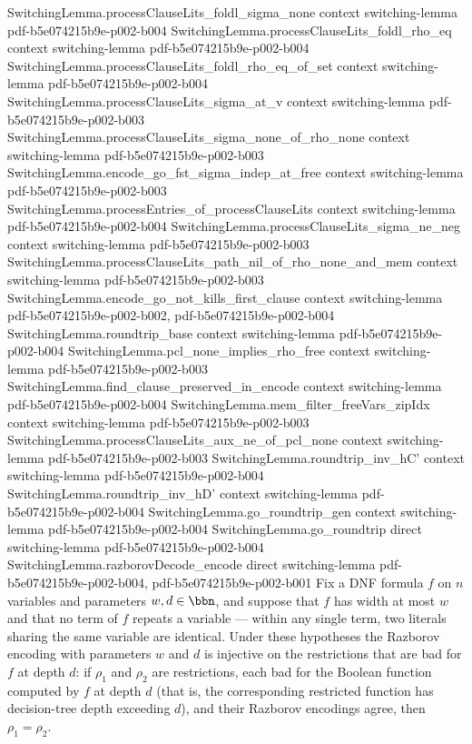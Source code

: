 \begin{theorem}
\proofstep
  {SwitchingLemma.processClauseLits_foldl_sigma_none}
  {context}
  {switching-lemma}
  {pdf-b5e074215b9e-p002-b004}
\proofstep
  {SwitchingLemma.processClauseLits_foldl_rho_eq}
  {context}
  {switching-lemma}
  {pdf-b5e074215b9e-p002-b004}
\proofstep
  {SwitchingLemma.processClauseLits_foldl_rho_eq_of_set}
  {context}
  {switching-lemma}
  {pdf-b5e074215b9e-p002-b004}
\proofstep
  {SwitchingLemma.processClauseLits_sigma_at_v}
  {context}
  {switching-lemma}
  {pdf-b5e074215b9e-p002-b003}
\proofstep
  {SwitchingLemma.processClauseLits_sigma_none_of_rho_none}
  {context}
  {switching-lemma}
  {pdf-b5e074215b9e-p002-b003}
\proofstep
  {SwitchingLemma.encode_go_fst_sigma_indep_at_free}
  {context}
  {switching-lemma}
  {pdf-b5e074215b9e-p002-b003}
\proofstep
  {SwitchingLemma.processEntries_of_processClauseLits}
  {context}
  {switching-lemma}
  {pdf-b5e074215b9e-p002-b004}
\proofstep
  {SwitchingLemma.processClauseLits_sigma_ne_neg}
  {context}
  {switching-lemma}
  {pdf-b5e074215b9e-p002-b003}
\proofstep
  {SwitchingLemma.processClauseLits_path_nil_of_rho_none_and_mem}
  {context}
  {switching-lemma}
  {pdf-b5e074215b9e-p002-b003}
\proofstep
  {SwitchingLemma.encode_go_not_kills_first_clause}
  {context}
  {switching-lemma}
  {pdf-b5e074215b9e-p002-b002,
    pdf-b5e074215b9e-p002-b004}
\proofstep
  {SwitchingLemma.roundtrip_base}
  {context}
  {switching-lemma}
  {pdf-b5e074215b9e-p002-b004}
\proofstep
  {SwitchingLemma.pcl_none_implies_rho_free}
  {context}
  {switching-lemma}
  {pdf-b5e074215b9e-p002-b003}
\proofstep
  {SwitchingLemma.find_clause_preserved_in_encode}
  {context}
  {switching-lemma}
  {pdf-b5e074215b9e-p002-b004}
\proofstep
  {SwitchingLemma.mem_filter_freeVars_zipIdx}
  {context}
  {switching-lemma}
  {pdf-b5e074215b9e-p002-b003}
\proofstep
  {SwitchingLemma.processClauseLits_aux_ne_of_pcl_none}
  {context}
  {switching-lemma}
  {pdf-b5e074215b9e-p002-b003}
\proofstep
  {SwitchingLemma.roundtrip_inv_hC'}
  {context}
  {switching-lemma}
  {pdf-b5e074215b9e-p002-b004}
\proofstep
  {SwitchingLemma.roundtrip_inv_hD'}
  {context}
  {switching-lemma}
  {pdf-b5e074215b9e-p002-b004}
\proofstep
  {SwitchingLemma.go_roundtrip_gen}
  {context}
  {switching-lemma}
  {pdf-b5e074215b9e-p002-b004}
\proofstep
  {SwitchingLemma.go_roundtrip}
  {direct}
  {switching-lemma}
  {pdf-b5e074215b9e-p002-b004}
\proofstep
  {SwitchingLemma.razborovDecode_encode}
  {direct}
  {switching-lemma}
  {pdf-b5e074215b9e-p002-b004,
    pdf-b5e074215b9e-p002-b001}
Fix a DNF formula $f$ on $n$ variables and parameters $w, d \in \bbn$, and suppose that
$f$ has width at most $w$ and that no term of $f$ repeats a variable — within any single
term, two literals sharing the same variable are identical. Under these hypotheses the
Razborov encoding with parameters $w$ and $d$ is injective on the restrictions that are
bad for $f$ at depth $d$: if $\rho_1$ and $\rho_2$ are restrictions, each bad for the
Boolean function computed by $f$ at depth $d$ (that is, the corresponding restricted
function has decision-tree depth exceeding $d$), and their Razborov encodings agree,
then $\rho_1 = \rho_2$.
\end{theorem}
